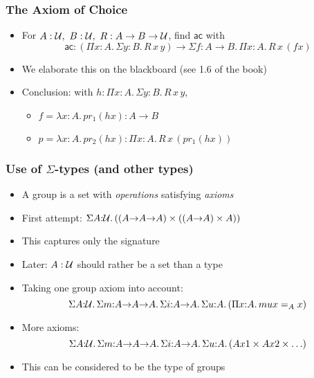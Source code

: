 \documentclass[handout]{beamer}
\newcommand{\depi}[3]{\Pi{#1{:}#2.\,#3}}
\newcommand{\sigm}[3]{\Sigma{#1{:}#2.\,#3}}
\newcommand{\lamt}[3]{\lambda{#1{:}#2.\,#3}}
\newcommand{\UU}{{\cal U}}
\begin{document}
\frame
  {
  
    \frametitle{The Axiom of Choice}

    \begin{itemize}[<+->]
    \item For $A:\UU,~B:\UU,~R:A\to B\to\UU$, find $\mathsf{ac}$ with
\[\mathsf{ac}:(\depi{x}{A}{\sigm{y}{B}{R\,x\,y}})\to\sigm{f}{A{\to}B}{\depi{x}{A}{R\,x\,(fx)}}\]
    \item We elaborate this on the blackboard (see 1.6 of the book)
    \item Conclusion: with $h:\depi{x}{A}{\sigm{y}{B}{R\,x\,y}}$,
      \begin{itemize}[<+->]
      \item $f = \lamt{x}{A}{pr_1 (hx)} : A \to B$
      \item $p =\lamt{x}{A}{pr_2 (hx)} : \depi{x}{A}{R\,x\, (pr_1(hx))}$
      \end{itemize}
    \end{itemize}
  }
  
\frame
  {  

    \frametitle{Use of $\Sigma$-types (and other types)}

    \begin{itemize}[<+->]
    \item A group is a set with \emph{operations} satisfying \emph{axioms}
    \item First attempt: $\sigm{A}{\UU}{((A{\to}A{\to}A) \times ((A{\to}A) \times A))}$
    \item This captures only the signature
    \item Later: $A:\UU$ should rather be a set than a type
    \item Taking one group axiom into account:
    $$\sigm{A}{\UU}{\sigm{m}{A{\to}A{\to}A}{\sigm{i}{A{\to}A}{\sigm{u}{A}{(\depi{x}{A}{mux=_Ax})}}}}$$
    \item More axioms:
    $$\sigm{A}{\UU}{\sigm{m}{A{\to}A{\to}A}{\sigm{i}{A{\to}A}{\sigm{u}{A}{(Ax1 \times Ax2 \times \ldots)}}}}$$
    \item This can be considered to be the type of groups
    \end{itemize}
  }
  
\end{document}
